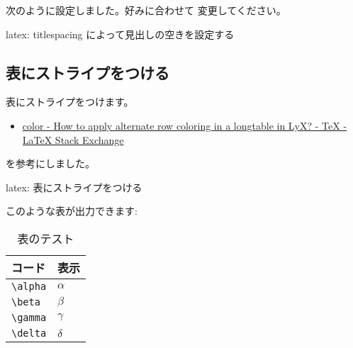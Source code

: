 \documentclass[dvipdfmx,a4j,14pt,uplatex]{jsarticle}
\begin{document}
次のように設定しました。好みに合わせて
変更してください。

\begin{programlist}[label={orgb696661}]{latex}{: titlespacing によって見出しの空きを設定する}\titlespacing*{\section}{0em}{2em}{2em}
\titlespacing*{\subsection}{0em}{2em}{2em}
\titlespacing*{\subsubsection}{0em}{2em}{2em}
\titlespacing*{\paragraph}{0em}{2em}{2em}
\end{programlist}


\subsection{表にストライプをつける}
\label{sec:org54d53b7}
表にストライプをつけます。

\begin{itemize}
\item \href{https://tex.stackexchange.com/questions/61747/how-to-apply-alternate-row-coloring-in-a-longtable-in-lyx}{color - How to apply alternate row coloring in a longtable in LyX? - \TeX{} - \LaTeX{} Stack Exchange}
\end{itemize}

を参考にしました。


\begin{programlist}[label={orgfa671a8}]{latex}{: 表にストライプをつける}%

\let\oldtabular\tabular
\let\endoldtabular\endtabular
\renewenvironment{tabular}{\rowcolors{2}{white}{lightgray}\oldtabular}{\endoldtabular}
\end{programlist}

このような表が出力できます:

\begin{table}[htbp]
\caption{表のテスト}
\centering
\begin{tabular}{ll}
コード & 表示\\
\hline
\texttt{\textbackslash{}alpha} & \(\alpha\)\\
\texttt{\textbackslash{}beta} & \(\beta\)\\
\texttt{\textbackslash{}gamma} & \(\gamma\)\\
\texttt{\textbackslash{}delta} & \(\delta\)\\
\hline
\end{tabular}
\end{table}
\end{document}
